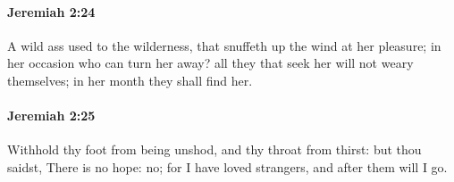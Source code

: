 		\paragraph{Jeremiah 2:24} %
			\label{JEREMIAH-2-24}

			A wild ass used to the wilderness, that snuffeth up the wind at her pleasure; in her occasion who can turn her away? all they that seek her will not weary themselves; in her month they shall find her.


		\paragraph{Jeremiah 2:25} %
			\label{JEREMIAH-2-25}

			Withhold thy foot from being unshod, and thy throat from thirst: but thou saidst, There is no hope: no; for I have loved strangers, and after them will I go.


